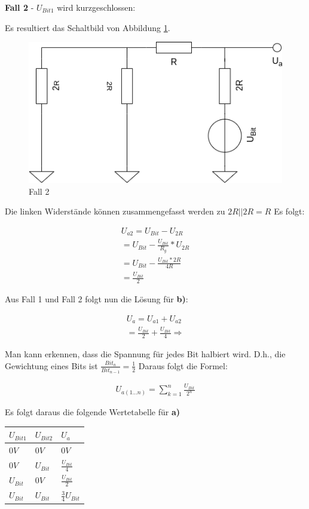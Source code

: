 \textbf{Fall 2} - $U_{Bit 1}$ wird kurzgeschlossen:

Es resultiert das Schaltbild von Abbildung \ref{fig:fall-2}.
\begin{figure}[h]
    \centering
    \includegraphics[width=\textwidth]{pictures/a5-1-fall-2.png}
    \caption{Fall 2}
    \label{fig:fall-2}
\end{figure}

Die linken Widerstände können zusammengefasst werden zu $2R || 2R = R$
Es folgt:

\begin{align}
    U_{a2} = U_{Bit} - U_{2R} \\
    = U_{Bit} - \frac{U_{Bit}}{R_g} * U_{2R} \\
    = U_{Bit} - \frac{U_{Bit} * 2R}{4R} \\
    = \frac{U_{Bit}}{2}
\end{align}

Aus Fall 1 und Fall 2 folgt nun die Lösung für \textbf{b)}:

\begin{align}
    U_a = U_{a1} + U_{a2} \\
    =  \frac{U_{Bit}}{2} +  \frac{U_{Bit}}{4} \Rightarrow
\end{align}

Man kann erkennen, dass die Spannung für jedes Bit halbiert wird.
D.h., die Gewichtung eines Bits ist $\frac{Bit_n}{Bit_{n-1}} = \frac{1}{2}$
Daraus folgt die Formel:

\begin{align}
    U_{a(1\dots n)} = \sum_{k=1}^{n}  \frac{U_{Bit}}{2^n}
\end{align}

Es folgt daraus die folgende Wertetabelle für \textbf{a)}

\begin{tabular}{| l | l | l |}
    \hline
    $U_{Bit 1}$ & $U_{Bit 2}$ & $U_a$ \\
    \hline
    $0V$ & $0V$ & $0V$ \\
    $0V$ & $U_{Bit}$ & $\frac{U_{Bit}}{4}$\\
    $U_{Bit}$ & $0V$  & $\frac{U_{Bit}}{2}$ \\
    $U_{Bit}$ & $U_{Bit}$  & $\frac{3}{4}U_{Bit}$\\
    \hline
\end{tabular}

